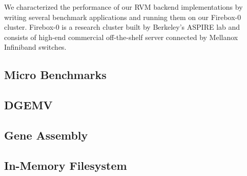 We characterized the performance of our RVM backend implementations by writing
several benchmark applications and running them on our Firebox-0 cluster.
Firebox-0 is a research cluster built by Berkeley's ASPIRE lab and consists
of high-end commercial off-the-shelf server connected by Mellanox Infiniband
switches.


\subsection{Micro Benchmarks}



\subsection{DGEMV}



\subsection{Gene Assembly}



\subsection{In-Memory Filesystem}


